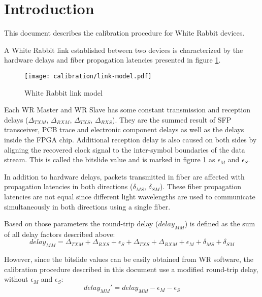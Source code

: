 \section{Introduction}

This document describes the calibration procedure for White Rabbit devices. 

A White Rabbit link established between two devices is characterized by the
hardware delays and fiber propagation latencies presented in figure
\ref{fig:intro:link-model}.

\begin{figure}[ht]
	\begin{center}
		\texttt{[image: calibration/link-model.pdf]}
		\caption{White Rabbit link model}
		\label{fig:intro:link-model}
	\end{center}
\end{figure}

Each WR Master and WR Slave has some constant transmission and reception delays
($\Delta_{TXM}$, $\Delta_{RXM}$, $\Delta_{TXS}$, $\Delta_{RXS}$). They are the
summed result of SFP transceiver, PCB trace and electronic component
delays as well as the delays inside the FPGA chip. Additional reception delay is
also caused on both sides by aligning the recovered clock signal to the inter-symbol
boundaries of the data stream. This is called the bitslide value and is marked in figure
\ref{fig:intro:link-model} as $\epsilon_M$ and $\epsilon_S$.

In addition to hardware delays, packets transmitted in fiber are affected with
propagation latencies in both directions ($\delta_{MS}$, $\delta_{SM}$). These
fiber propagation latencies are not equal since different light wavelengths are 
used to communicate simultaneously in both directions using a single fiber.

Based on those parameters the round-trip delay ($delay_{MM}$) is defined as the
sum of all delay factors described above:
\begin{equation}
	delay_{MM} = \Delta_{TXM} + \Delta_{RXS} + \epsilon_S + \Delta_{TXS} +
	\Delta_{RXM} + \epsilon_M + \delta_{MS} + \delta_{SM}
\end{equation}

However, since the bitslide values can be easily obtained from WR software, 
the calibration procedure described in this document use a modified round-trip delay, 
without $\epsilon_M$ and $\epsilon_S$:
\begin{equation}
	delay_{MM}' = delay_{MM} - \epsilon_M - \epsilon_S
\end{equation}

